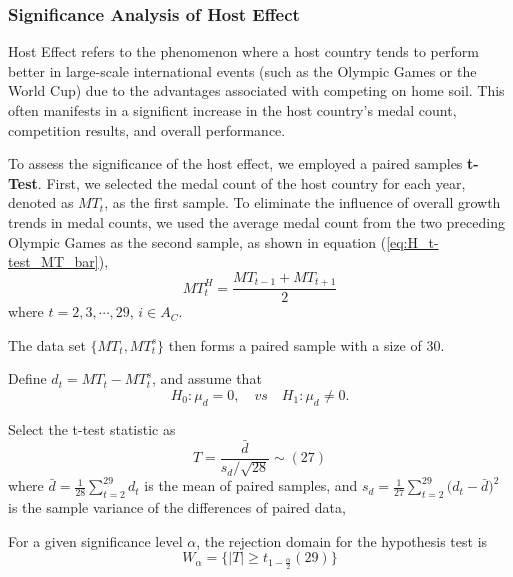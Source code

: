 \documentclass{mcmthesis}
\begin{document}
	\subsubsection{Significance Analysis of Host Effect}
	
Host Effect refers to the phenomenon where a host country tends to perform better in large-scale international events (such as the Olympic Games or the World Cup) due to the advantages associated with competing on home soil. This often manifests in a significnt increase in the host country's medal count, competition results, and overall performance.

	
	To assess the significance of the host effect, we employed a paired samples  \textbf{t-Test}. First, we selected the medal count of the host country for each year, denoted as $MT_{t}$, as the first sample. To eliminate the influence of overall growth trends in medal counts, we used the average medal count from the two preceding Olympic Games as the second sample, as shown in equation (\ref{eq:H_t-test_MT_bar}),
	\begin{equation*}
		MT^H_{t}=\frac{ MT_{t-1} + MT_{t+1} }{2}
		\label{eq:H_t-test_MT_bar}
	\end{equation*}
	where $t=2,3,\cdots,29$, $i\in A_{C}$. 
	
	The data set $\{MT_{t},MT^s_{t}\}$ then forms a paired sample with a size of 30. 
	
	Define $d_t= MT_{t} - MT^s_{t}$, and assume that
	\begin{equation*}
		H_0: \mu_d=0, \quad vs \quad H_1:  \mu_d \ne 0.
	\end{equation*}
	
	Select the t-test statistic as
	\begin{equation*}
		T=\frac{ \bar{d} }{ s_d\slash \sqrt{28} } \sim (27)
	\end{equation*}
	where $\bar{d}=\frac{1}{28} \sum_{t=2}^{29} d_t$ is the mean of paired samples, 
	and $ s_d = \frac{1}{27} \sum_{t=2}^{29}\big( d_t - \bar{d} \big)^2 $ is the sample variance of the differences of paired data, 
	
	For a given significance level $\alpha$, the rejection domain for the hypothesis test is
	\begin{equation*}
		W_\alpha = \big\{ |T| \ge t_{1-\frac{\alpha}{2}}(29) \big\}
	\end{equation*}
	
\end{document}
